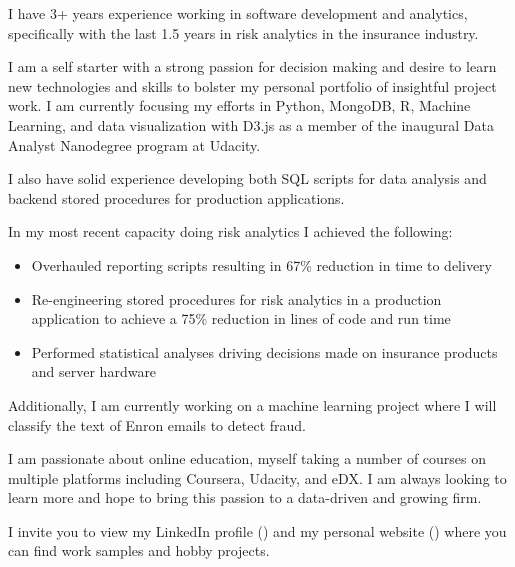 \documentclass[10pt,a4paper,sans]{moderncv}        %
\begin{document}
I have 3+ years experience working in software development and analytics, specifically with the last 1.5 years in risk analytics in the insurance industry.

I am a self starter with a strong passion for decision making and desire to learn new technologies and skills to bolster my personal portfolio of insightful project work.  I am currently focusing my efforts in Python, MongoDB, R, Machine Learning, and data visualization with D3.js as a member of the inaugural Data Analyst Nanodegree program at Udacity.  

I also have solid experience developing both SQL scripts for data analysis and backend stored procedures for production applications.

In my most recent capacity doing risk analytics I achieved the following:

\begin{itemize}
\item{Overhauled reporting scripts resulting in 67\% reduction in time to delivery}
\item{Re-engineering stored procedures for risk analytics in a production application to achieve a 75\% reduction in lines of code and run time}
\item{Performed statistical analyses driving decisions made on insurance products and server hardware}
\end{itemize}

Additionally, I am currently working on a machine learning project where I will classify the text of Enron emails to detect fraud.

I am passionate about online education, myself taking a number of courses on multiple platforms including Coursera, Udacity, and eDX.  I am always looking to learn more and hope to bring this passion to a data-driven and growing firm.

I invite you to view my LinkedIn profile () and my personal website () where you can find work samples and hobby projects.


\makeletterclosing

\end{document}
